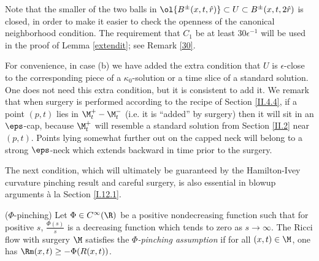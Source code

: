 \begin{remark}
  \label{rem:kl-priori-assumptions-continuation-canonical-neighborhoods}

Note that the smaller of the
two balls in $\ol{B^\pm(x,t,\hat r)}\subset U\subset B^\pm(x,t,2\hat r)$ is closed,
in order to
make it easier to check the openness of the canonical neighborhood condition.
The requirement that $C_1$ be at least $30 \epsilon^{-1}$ will be used
in the proof of Lemma \ref{extendit}; see Remark \ref{30}.
\end{remark}

\begin{remark}
  \label{rem:kl-priori-assumptions-continuation-kappa-solutions}

For convenience, in case (b) we have added the
extra condition that $U$ is $\epsilon$-close to the
corresponding piece of a $\kappa_0$-solution or
a time slice of a standard solution.
One does not need this
extra condition, but it is consistent to add it.
We remark that when surgery is performed according to the recipe
of Section \ref{II.4.4}, if a point $(p,t)$ lies in $\M_t^+   -  \M_t^-$ (i.e.
it  is ``added'' by surgery) then
it will sit in an $\eps$-cap, because $\M_t^+$ will resemble
a standard solution from Section \ref{II.2} near $(p,t)$.   Points lying
somewhat further out on the capped neck will belong to a strong
$\eps$-neck which extends backward in time prior to the surgery.
 \end{remark}

The next condition, which will ultimately be guaranteed by the
Hamilton-Ivey curvature pinching result and careful surgery,
is also essential in blowup arguments \`a la Section
\ref{I.12.1}.
\begin{definition}
  \label{def:kl-priori-assumptions-curvature-pinching-assumption}
($\Phi$-pinching)
\label{phipinchingdef}
Let  $\Phi \in C^\infty(\R)$ be a positive nondecreasing
function such that for positive $s$,
$\frac{\Phi(s)}{s}$ is a decreasing function which tends to zero
as $s \rightarrow \infty$.  The Ricci flow with surgery $\M$
satisfies the {\em $\Phi$-pinching assumption} if for all
$(x,t) \in \M$, one has $\Rm(x,t) \geq -\Phi(R(x,t))$.
\end{definition}

